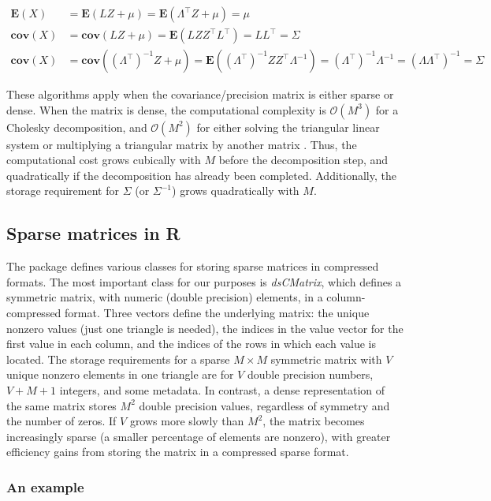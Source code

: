 \documentclass[codesnippet,nojss]{jss}\usepackage[]{graphicx}\usepackage[]{color}
\newcommand{\class}[1]{\textsl{#1}}
\newcommand{\EV}[1]{\mathbf{E}\!\left(#1\right)}
\newcommand{\Cov}[1]{\mathbf{cov}\!\left(#1\right)}
\newcommand{\bigO}[1]{\mathcal{O}\!\left(#1\right)}
\begin{document}
 \begin{align}
 \EV{X}&=\EV{LZ+\mu}=\EV{\Lambda^\top Z+\mu}=\mu\\
   \Cov{X}&= \Cov{LZ+\mu}=\EV{LZZ^\top L^\top}=LL^\top=\Sigma\\
     \Cov{X}&=\Cov{(\Lambda^\top)^{-1}Z+\mu}=\EV{(\Lambda^\top)^{-1}ZZ^\top\Lambda^{-1}}
     =(\Lambda^\top)^{-1}\Lambda^{-1}=(\Lambda\Lambda^\top)^{-1}=\Sigma
 \end{align}

These algorithms apply when the covariance/precision matrix is either
sparse or dense.  When the matrix is dense, the computational
complexity is $\bigO{M^3}$  for a Cholesky decomposition, and
$\bigO{M^2}$ for either solving the triangular linear
system or multiplying a triangular matrix by another matrix
\citep{GolubVanLoan1996}.  Thus, the computational cost grows
cubically with $M$ before the decomposition step, and quadratically if
the decomposition has already been completed.  Additionally, the storage
requirement for $\Sigma$ (or $\Sigma^{-1}$) grows quadratically with $M$.



\subsection{Sparse matrices in R}\label{sec:sparse}

The  package \citep{R_Matrix} defines
various classes for storing sparse matrices in compressed formats. The
most important class for our purposes is
\class{dsCMatrix}, which defines a symmetric matrix, with numeric
(double precision) elements, in a column-compressed format.  Three
vectors define the underlying matrix:
the unique nonzero values (just one triangle is needed), the indices
in the value vector for the first value in each column, and the indices of the rows in
which each value is located. The storage requirements
for a sparse $M\times M$ symmetric matrix with $V$ unique nonzero
elements in one triangle are for $V$ double precision numbers, $V+M+1$ integers, and
some metadata.  In contrast, a dense representation of the same matrix
stores $M^2$ double precision values, regardless of symmetry and the number of
zeros. If $V$ grows more slowly than $M^2$, the matrix becomes
increasingly sparse (a smaller percentage of elements are nonzero),
with greater efficiency gains from storing the matrix in a
compressed sparse format.

\subsubsection{An example}
\end{document}
